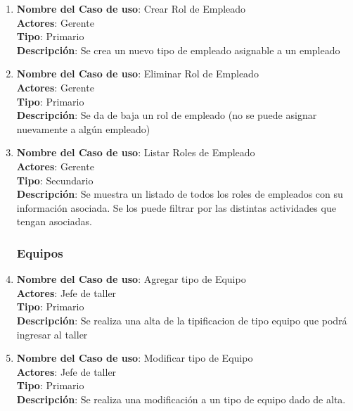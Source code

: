 \documentclass[12pt]{extarticle}
\begin{document}
\begin{spacing}{1.2}
\begin{enumerate}
            \item 	\textbf{Nombre del Caso de uso}: Crear Rol de Empleado\\
                    \textbf{Actores}: Gerente\\
                    \textbf{Tipo}: Primario\\
                    \textbf{Descripción}: Se crea un nuevo tipo de empleado asignable a un empleado
            
            \item 	\textbf{Nombre del Caso de uso}: Eliminar Rol de Empleado\\
                    \textbf{Actores}: Gerente\\
                    \textbf{Tipo}: Primario\\
                    \textbf{Descripción}: Se da de baja un rol de empleado (no se puede asignar nuevamente a algún empleado)
            
            \item 	\textbf{Nombre del Caso de uso}: Listar Roles de Empleado\\
                    \textbf{Actores}: Gerente\\
                    \textbf{Tipo}: Secundario\\
                    \textbf{Descripción}: Se muestra un listado de todos los roles de empleados con su información asociada. Se los puede filtrar por las distintas actividades que tengan asociadas.
            


            \subsubsection{Equipos}



            \item 	\textbf{Nombre del Caso de uso}: Agregar tipo de Equipo\\
                    \textbf{Actores}: Jefe de taller\\
                    \textbf{Tipo}: Primario\\
                    \textbf{Descripción}: Se realiza una alta de la tipificacion de tipo equipo que podrá ingresar al taller 
            
            \item 	\textbf{Nombre del Caso de uso}: Modificar tipo de Equipo\\
                    \textbf{Actores}: Jefe de taller\\
                    \textbf{Tipo}: Primario\\
                    \textbf{Descripción}: Se realiza una modificación a un tipo de equipo dado de alta.
            

\end{enumerate}
\end{spacing}
\end{document}
